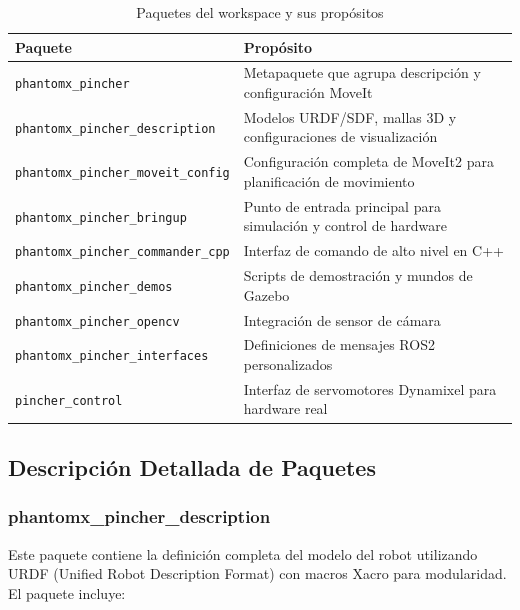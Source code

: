 \begin{table}[H]
\centering
\caption{Paquetes del workspace y sus propósitos}
\label{tab:paquetes_workspace}
\small
\begin{tabular}{|p{5.5cm}|p{9cm}|}
\hline
\textbf{Paquete} & \textbf{Propósito} \\
\hline
\texttt{phantomx\_pincher} & Metapaquete que agrupa descripción y configuración MoveIt \\
\texttt{phantomx\_pincher\_description} & Modelos URDF/SDF, mallas 3D y configuraciones de visualización \\
\texttt{phantomx\_pincher\_moveit\_config} & Configuración completa de MoveIt2 para planificación de movimiento \\
\texttt{phantomx\_pincher\_bringup} & Punto de entrada principal para simulación y control de hardware \\
\texttt{phantomx\_pincher\_commander\_cpp} & Interfaz de comando de alto nivel en C++ \\
\texttt{phantomx\_pincher\_demos} & Scripts de demostración y mundos de Gazebo \\
\texttt{phantomx\_pincher\_opencv} & Integración de sensor de cámara \\
\texttt{phantomx\_pincher\_interfaces} & Definiciones de mensajes ROS2 personalizados \\
\texttt{pincher\_control} & Interfaz de servomotores Dynamixel para hardware real \\
\hline
\end{tabular}
\end{table}

\subsection{Descripción Detallada de Paquetes}

\subsubsection{phantomx\_pincher\_description}

Este paquete contiene la definición completa del modelo del robot utilizando URDF (Unified Robot Description Format) con macros Xacro para modularidad. El paquete incluye:


